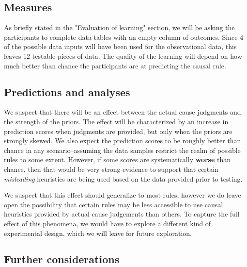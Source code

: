 \documentclass[10pt,letterpaper]{article}
\begin{document}
\newpage

\subsection*{Measures}

As briefly stated in the "Evaluation of learning" section, we will be asking the participants to complete data tables with an empty column of outcomes.
Since 4 of the possible data inputs will have been used for the observational data, this leaves 12 testable pieces of data. 
The quality of the learning will depend on how much better than chance the participants are at predicting the causal rule.


\subsection*{Predictions and analyses}

We suspect that there will be an effect between the actual cause judgments and the strength of the priors. The effect will be characterized by an increase in prediction scores when judgments are provided, but only when the priors are strongly skewed. 
We also expect the prediction scores to be roughly better than chance in any scenario--assuming the data samples restrict the realm of possible rules to some extent.
However, if some scores are systematically \textbf{worse} than chance, then that would be very strong evidence to support that certain \textit{misleading} heuristics are being used based on the data provided prior to testing.

We suspect that this effect should generalize to most rules, however we do leave open the possibility that certain rules may be less accessible to use causal heuristics provided by actual cause judgements than others. To capture the full effect of this phenomena, we would have to explore a different kind of experimental design, which we will leave for future exploration. 


\subsection*{Further considerations}
\end{document}
